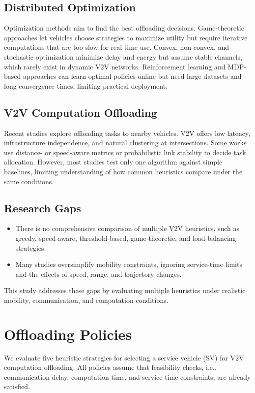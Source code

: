 \documentclass[conference]{IEEEtran}
\begin{document}
\subsection{Distributed Optimization}
Optimization methods aim to find the best offloading decisions. Game-theoretic approaches let vehicles choose strategies to maximize utility but require iterative computations that are too slow for real-time use. Convex, non-convex, and stochastic optimization minimize delay and energy but assume stable channels, which rarely exist in dynamic V2V networks. Reinforcement learning and MDP-based approaches can learn optimal policies online but need large datasets and long convergence times, limiting practical deployment.

\subsection{V2V Computation Offloading}
Recent studies explore offloading tasks to nearby vehicles. V2V offers low latency, infrastructure independence, and natural clustering at intersections. Some works use distance- or speed-aware metrics or probabilistic link stability to decide task allocation. However, most studies test only one algorithm against simple baselines, limiting understanding of how common heuristics compare under the same conditions.

\subsection{Research Gaps}
\begin{itemize}
    \item There is no comprehensive comparison of multiple V2V heuristics, such as greedy, speed-aware, threshold-based, game-theoretic, and load-balancing strategies.
    \item Many studies oversimplify mobility constraints, ignoring service-time limits and the effects of speed, range, and trajectory changes.
\end{itemize}
This study addresses these gaps by evaluating multiple heuristics under realistic mobility, communication, and computation conditions.

\section{Offloading Policies}
We evaluate five heuristic strategies for selecting a service vehicle (SV) for V2V computation offloading. All policies assume that feasibility checks, i.e., communication delay, computation time, and service-time constraints, are already satisfied.
\end{document}
